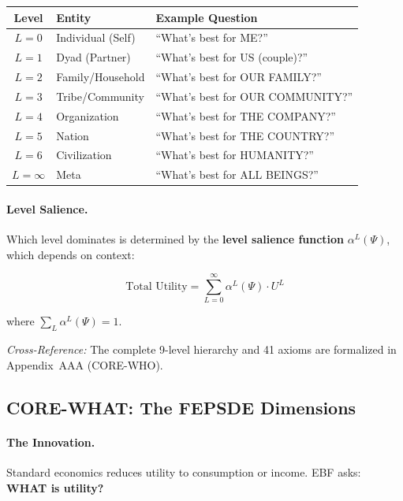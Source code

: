 \begin{center}
\renewcommand{\arraystretch}{1.2}
\begin{tabular}{@{}cll@{}}
\toprule
\textbf{Level} & \textbf{Entity} & \textbf{Example Question} \\
\midrule
$L = 0$ & Individual (Self) & ``What's best for ME?'' \\
$L = 1$ & Dyad (Partner) & ``What's best for US (couple)?'' \\
$L = 2$ & Family/Household & ``What's best for OUR FAMILY?'' \\
$L = 3$ & Tribe/Community & ``What's best for OUR COMMUNITY?'' \\
$L = 4$ & Organization & ``What's best for THE COMPANY?'' \\
$L = 5$ & Nation & ``What's best for THE COUNTRY?'' \\
$L = 6$ & Civilization & ``What's best for HUMANITY?'' \\
$L = \infty$ & Meta & ``What's best for ALL BEINGS?'' \\
\bottomrule
\end{tabular}
\end{center}

\paragraph{Level Salience.}
Which level dominates is determined by the \textbf{level salience function}
$\alpha^L(\Psi)$, which depends on context:

\begin{equation}
\text{Total Utility} = \sum_{L=0}^{\infty} \alpha^L(\Psi) \cdot U^L
\end{equation}

where $\sum_L \alpha^L(\Psi) = 1$.

\textit{Cross-Reference:} The complete 9-level hierarchy and 41 axioms are
formalized in Appendix~AAA (CORE-WHO).

\subsection{CORE-WHAT: The FEPSDE Dimensions}
\label{sec:10c-what}

\paragraph{The Innovation.}
Standard economics reduces utility to consumption or income. EBF asks:
\textbf{WHAT is utility?}

